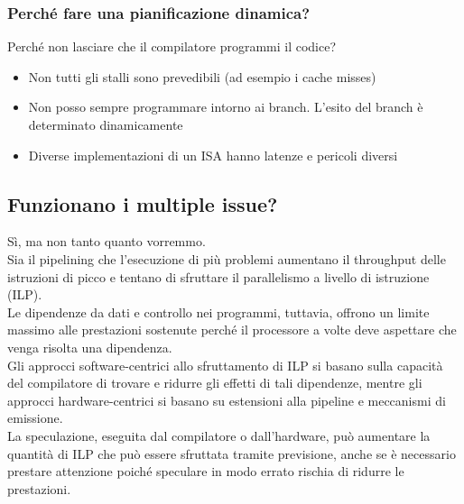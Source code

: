 \documentclass[12pt,a4paper]{article}
\begin{document}
\subsubsection{Perché fare una pianificazione dinamica?}
Perché non lasciare che il compilatore programmi il codice?\\
\begin{itemize}
\item Non tutti gli stalli sono prevedibili (ad esempio i cache misses)\\
\item Non posso sempre programmare intorno ai branch. L'esito del branch è determinato dinamicamente\\
\item Diverse implementazioni di un ISA hanno latenze e pericoli diversi
\end{itemize}

\subsection{Funzionano i multiple issue?}
Sì, ma non tanto quanto vorremmo.\\
Sia il pipelining che l'esecuzione di più problemi aumentano il throughput delle istruzioni di picco e tentano di sfruttare il parallelismo a livello di istruzione (ILP).\\
Le dipendenze da dati e controllo nei programmi, tuttavia, offrono un limite massimo alle prestazioni sostenute perché il processore a volte deve aspettare che venga risolta una dipendenza.\\
Gli approcci software-centrici allo sfruttamento di ILP si basano sulla capacità del compilatore di trovare e ridurre gli effetti di tali dipendenze, mentre gli approcci hardware-centrici si basano su estensioni alla pipeline e meccanismi di emissione.\\
La speculazione, eseguita dal compilatore o dall'hardware, può aumentare la quantità di ILP che può essere sfruttata tramite previsione, anche se è necessario prestare attenzione poiché speculare in modo errato rischia di ridurre le prestazioni.
\end{document}
